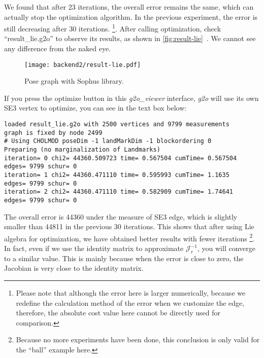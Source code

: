 We found that after 23 iterations, the overall error remains the same, which can actually stop the optimization algorithm. In the previous experiment, the error is still decreasing after 30 iterations. \footnote{Please note that although the error here is larger numerically, because we redefine the calculation method of the error when we customize the edge, therefore, the absolute cost value here cannot be directly used for comparison. }. After calling optimization, check ``result\_lie.g2o'' to observe its results, as shown in \autoref{fig:result-lie}~. We cannot see any difference from the naked eye.

\begin{figure}[!ht]
	\centering
	\texttt{[image: backend2/result-lie.pdf]}
	\caption{Pose graph with Sophus library.}
	\label{fig:result-lie}
\end{figure}

If you press the optimize button in this \textit{g2o\_viewer} interface, \textit{g2o} will use its own SE3 vertex to optimize, you can see in the text box below:
\begin{lstlisting}
loaded result_lie.g2o with 2500 vertices and 9799 measurements
graph is fixed by node 2499
# Using CHOLMOD poseDim -1 landMarkDim -1 blockordering 0
Preparing (no marginalization of Landmarks)
iteration= 0 chi2= 44360.509723 time= 0.567504 cumTime= 0.567504 edges= 9799 schur= 0
iteration= 1 chi2= 44360.471110 time= 0.595993 cumTime= 1.1635   edges= 9799 schur= 0
iteration= 2 chi2= 44360.471110 time= 0.582909 cumTime= 1.74641  edges= 9799 schur= 0
\end{lstlisting}

The overall error is 44360 under the measure of SE3 edge, which is slightly smaller than 44811 in the previous 30 iterations. This shows that after using Lie algebra for optimization, we have obtained better results with fewer iterations \footnote{Because no more experiments have been done, this conclusion is only valid for the ``ball'' example here.}. In fact, even if we use the identity matrix to approximate $\bm{\mathcal{J}}_r^{-1}$, you will converge to a similar value. This is mainly because when the error is close to zero, the Jacobian is very close to the identity matrix.

